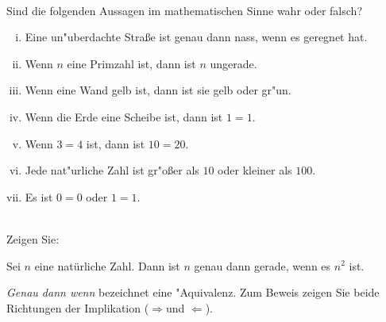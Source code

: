 \newcommand{\printpraesenzlsg}{false}
\newcommand{\printloesungen}{false}
\newcommand{\printbewertungen}{false}
\newcommand{\blattnummer}{1}



\iforiginal{}

	

 \\
Sind die folgenden Aussagen im mathematischen Sinne wahr oder
falsch?

\begin{enumerate}[(i)]
  \item Eine un"uberdachte Stra\ss e ist genau dann nass, wenn es geregnet hat.
  \item Wenn $n$ eine Primzahl ist, dann ist $n$ ungerade.
  \item Wenn eine Wand gelb ist, dann ist sie gelb oder gr"un.
  \item Wenn die Erde eine Scheibe ist, dann ist $1=1$.
  \item Wenn $3=4$ ist, dann ist $10=20$.
  \item Jede nat"urliche Zahl ist gr"o\ss er als $10$ oder kleiner als $100$.
  \item Es ist $0=0$ oder $1=1$.
\end{enumerate}


 \\
Zeigen Sie:

Sei $n$ eine natürliche Zahl. Dann ist $n$ genau dann gerade, wenn es $n^2$ ist.

\begin{notes}
	\textit{Genau dann wenn} bezeichnet eine "Aquivalenz. Zum Beweis zeigen Sie beide Richtungen der Implikation (\glqq $\Rightarrow$\grqq und \glqq$\Leftarrow$\grqq).
\end{notes}

